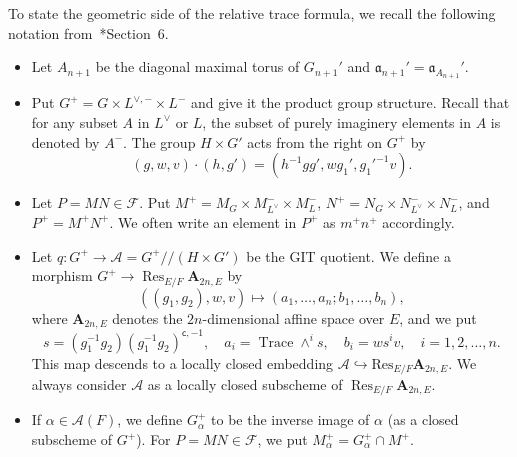 \documentclass[letterpaper,11pt]{amsart}
\newcommand{\fa}{\mathfrak{a}}
\newcommand{\cA}{\mathcal{A}}
\newcommand{\cF}{\mathcal{F}}
\newcommand{\<}{\negthickspace}
\DeclareMathOperator{\Trace}{Trace}
\DeclareMathOperator{\Res}{Res}
\theoremstyle{definition}
\theoremstyle{plain}
\theoremstyle{remark}
\numberwithin{equation}{section}
\begin{document}
To state the geometric side of the relative trace formula, we recall the following notation from~\cite{BLX1}*{Section~6}.
\begin{itemize}
\item Let $A_{n+1}$ be the diagonal maximal torus of $G_{n+1}'$ and $\fa_{n+1}' = \fa_{A_{n+1}}'$.

\item Put $G^+ = G \times L^{\vee, -} \times L^-$ and give it the product group structure. Recall that for any subset $A$ in $L^\vee$ or $L$, the subset of purely imaginery elements in $A$ is denoted by $A^-$. The group $H \times G'$ acts from the right on $G^+$ by
    \begin{equation}    \label{eq:action_G^+}
    (g,w,v) \cdot (h,g') = (h^{-1}gg',w g_1',g_1'^{-1} v).
    \end{equation}



\item Let $P = MN \in \cF$. Put $M^+ = M_G \times
    M_{L^{\vee}}^{-} \times M_L^{-}$, $N^+ = N_G \times N_{L^{\vee}}^-
    \times N^{-}_L$, and $P^+ = M^+ N^+$. We often write an element in $P^+$ as  $m^+n^+$ accordingly.

\item Let $q: G^+ \to \cA= G^+//(H \times G')$ be     the GIT quotient. We define a morphism $G^+ \to \Res_{E/F} \mathbf{A}_{2n, E}$ by
        \begin{equation} \label{eq:gl_GIT_map}
        ((g_1, g_2), w, v) \mapsto (a_1, \hdots, a_n; b_1, \hdots, b_n),
        \end{equation}
        where $\mathbf{A}_{2n, E}$ denotes the $2n$-dimensional affine space over $E$, and we put
        \[
        s = (g_1^{-1} g_2)(g_1^{-1}g_2)^{\mathsf{c}, -1}, \quad
        a_i = \Trace \wedge^i s,
        \quad b_i = w  s^i v, \quad i = 1, 2, \hdots, n.
        \]
    This map descends to a locally closed embedding $\cA \hookrightarrow \mathrm{Res}_{E/F} \mathbf{A}_{2n, E}$. We always consider $\cA$ as a locally closed subscheme of $\Res_{E/F}\mathbf{A}_{2n, E}$.

\item If $\alpha \in \cA(F)$, we define $G^+_{\alpha}$ to be the inverse
    image of $\alpha$ (as a closed subscheme of $G^+$). For $P = MN \in \cF$, we put
    $M^+_{\alpha} = G^+_\alpha \cap M^+$.
\end{itemize}
\end{document}
